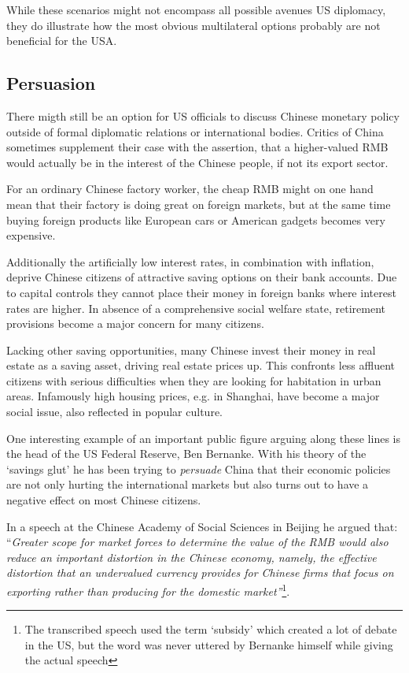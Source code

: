 While these scenarios might not encompass all possible avenues US diplomacy, they do illustrate how the most obvious 
multilateral options probably are not beneficial for the USA.


\subsection{Persuasion}

There migth still be an option for US officials to discuss Chinese monetary policy outside of formal diplomatic relations or international bodies. Critics of China sometimes supplement their case with the assertion, 
that a higher-valued RMB would actually be in the interest of the 
Chinese people, if not its export sector.

For an ordinary Chinese factory worker, the cheap RMB might on one hand 
mean that their factory is doing great on foreign markets, but at the 
same time buying foreign products like European cars or American gadgets 
becomes very expensive. 

Additionally the artificially low interest rates, in combination with 
inflation, deprive Chinese citizens of attractive saving options on 
their bank accounts. Due to capital controls they cannot place their 
money in foreign banks where interest rates are higher. In absence of a 
comprehensive social welfare state, retirement provisions become a major 
concern for many citizens.

Lacking other saving opportunities, many Chinese invest their money in 
real estate as a saving asset, driving real estate prices up.  This 
confronts less affluent citizens with serious difficulties when they are 
looking for habitation in urban areas.  Infamously high housing prices, 
e.g.  in Shanghai, have become a major social issue, also reflected in 
popular culture. 

One interesting example of an important public figure arguing along 
these lines is the head of the US Federal Reserve, Ben Bernanke. With his theory of the `savings glut' he has 
been trying to \emph{persuade} China that their economic policies are not only 
hurting the international markets but also turns out to have a negative 
effect on most Chinese citizens.  

In a speech at the Chinese Academy of Social Sciences in Beijing he 
argued that: ``\textit{Greater scope for market forces to determine the 
	value of the RMB would also reduce an important distortion in the 
	Chinese economy, namely, the effective distortion that an 
undervalued currency provides for Chinese firms that focus on exporting 
rather than producing for the domestic market''}\footnote{The 
	transcribed speech \cite{Bernanke06} used the term `subsidy' which 
created a lot of debate in the US, but the word was never uttered by 
Bernanke himself while giving the actual speech\cite{reuters06}}.

